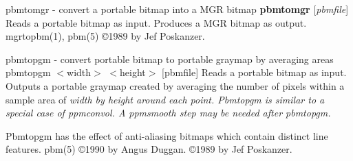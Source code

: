 %

\newpage
%

pbmtomgr - convert a portable bitmap into a MGR bitmap
{\bf pbmtomgr}
{\rm [}{\it pbmfile}{\rm ]}
Reads a portable bitmap as input.
Produces a MGR bitmap as output.
mgrtopbm(1), pbm(5)
\copyright 1989 by Jef Poskanzer.
%
 
%

\newpage
%

pbmtopgm - convert portable bitmap to portable graymap by averaging areas
pbmtopgm $<$width$>$ $<$height$>$ [pbmfile]
Reads a portable bitmap as input. Outputs a portable graymap created by
averaging the number of pixels within a sample area of
%
\it width %
\rm by %
\it height %
\rm around each point. Pbmtopgm is similar to a
special case of ppmconvol. A ppmsmooth step may be needed after pbmtopgm.
\par
Pbmtopgm has the effect of anti-aliasing bitmaps which contain distinct
line features.
pbm(5)
\copyright 1990 by Angus Duggan.
\copyright 1989 by Jef Poskanzer.

